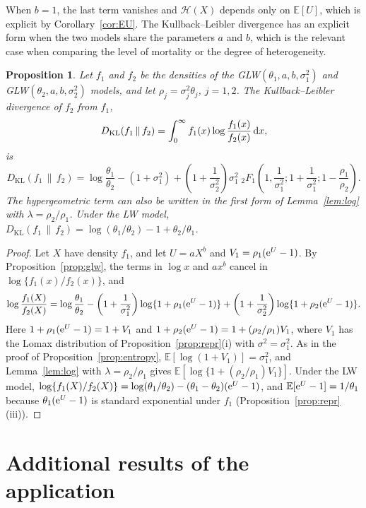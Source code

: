 \documentclass[12pt]{article}
\newcommand{\E}{\mathbb{E}}       %
\newcommand{\e}{{\rm e}}         %
\newcommand{\dd}{{\rm d}}        %
\newtheorem{proposition}{Proposition}
\begin{document}
When $b=1$, the last term vanishes and $\mathcal{H}(X)$ depends only on $\E[U]$, which is explicit by Corollary~\ref{cor:EU}. The Kullback--Leibler divergence has an explicit form when the two models share the parameters $a$ and $b$, which is the relevant case when comparing the level of mortality or the degree of heterogeneity.

\begin{proposition}\label{prop:kl}
Let $f_1$ and $f_2$ be the densities of the GLW$(\theta_1,a,b,\sigma_1^2)$ and GLW$(\theta_2,a,b,\sigma_2^2)$ models, and let $\rho_j=\sigma_j^2\theta_j$, $j=1,2$. The Kullback--Leibler divergence of $f_2$ from $f_1$,
\[
D_{\mathrm{KL}}(f_1\,\|\,f_2)=\int_0^\infty f_1(x)\log\frac{f_1(x)}{f_2(x)}\,\dd x,
\]
is
\begin{equation}\label{eq:kl}
D_{\mathrm{KL}}(f_1\,\|\,f_2)=\log\frac{\theta_1}{\theta_2}-\left(1+\sigma_1^2\right)+\left(1+\frac1{\sigma_2^2}\right)\sigma_1^2\;{}_2F_1\!\left(1,\frac1{\sigma_1^2};1+\frac1{\sigma_1^2};1-\frac{\rho_1}{\rho_2}\right).
\end{equation}
The hypergeometric term can also be written in the first form of Lemma~\ref{lem:log} with $\lambda=\rho_2/\rho_1$. Under the LW model, $D_{\mathrm{KL}}(f_1\,\|\,f_2)=\log(\theta_1/\theta_2)-1+\theta_2/\theta_1$.
\end{proposition}

\begin{proof}
Let $X$ have density $f_1$, and let $U=aX^b$ and $V_1=\rho_1(\e^U-1)$. By Proposition~\ref{prop:glw}, the terms in $\log x$ and $ax^b$ cancel in $\log\{f_1(x)/f_2(x)\}$, and
\[
\log\frac{f_1(X)}{f_2(X)}=\log\frac{\theta_1}{\theta_2}-\left(1+\frac{1}{\sigma_1^2}\right)\log\{1+\rho_1(\e^U-1)\}+\left(1+\frac{1}{\sigma_2^2}\right)\log\{1+\rho_2(\e^U-1)\}.
\]
Here $1+\rho_1(\e^U-1)=1+V_1$ and $1+\rho_2(\e^U-1)=1+(\rho_2/\rho_1)V_1$, where $V_1$ has the Lomax distribution of Proposition~\ref{prop:repr}(i) with $\sigma^2=\sigma_1^2$. As in the proof of Proposition~\ref{prop:entropy}, $\E[\log(1+V_1)]=\sigma_1^2$, and Lemma~\ref{lem:log} with $\lambda=\rho_2/\rho_1$ gives $\E[\log\{1+(\rho_2/\rho_1)V_1\}]$. Under the LW model, $\log\{f_1(X)/f_2(X)\}=\log(\theta_1/\theta_2)-(\theta_1-\theta_2)(\e^U-1)$, and $\E[\e^U-1]=1/\theta_1$ because $\theta_1(\e^U-1)$ is standard exponential under $f_1$ (Proposition~\ref{prop:repr}(iii)).
\end{proof}

\section{Additional results of the application}\label{app:application}
\end{document}

